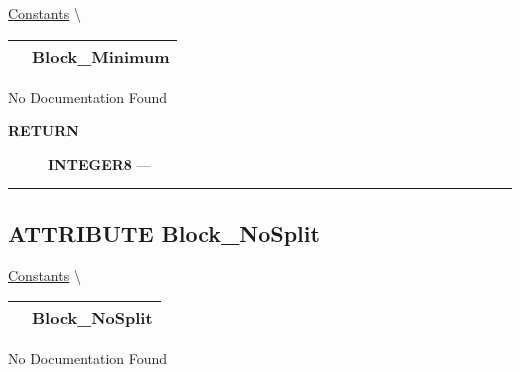 \hypertarget{ecldoc:pbblas.constants.block_minimum}{}
\hspace{0pt} \hyperlink{ecldoc:PBblas.Constants}{Constants} \textbackslash 

{\renewcommand{\arraystretch}{1.5}
\begin{tabularx}{\textwidth}{|>{\raggedright\arraybackslash}l|X|}
\hline
\hspace{0pt}\mytexttt{\color{red} } & \textbf{Block\_Minimum} \\
\hline
\end{tabularx}
}

\par





No Documentation Found








\par
\begin{description}
\item [\colorbox{tagtype}{\color{white} \textbf{\textsf{RETURN}}}] \textbf{INTEGER8} --- 
\end{description}




\rule{\linewidth}{0.5pt}
\subsection*{\textsf{\colorbox{headtoc}{\color{white} ATTRIBUTE}
Block\_NoSplit}}

\hypertarget{ecldoc:pbblas.constants.block_nosplit}{}
\hspace{0pt} \hyperlink{ecldoc:PBblas.Constants}{Constants} \textbackslash 

{\renewcommand{\arraystretch}{1.5}
\begin{tabularx}{\textwidth}{|>{\raggedright\arraybackslash}l|X|}
\hline
\hspace{0pt}\mytexttt{\color{red} } & \textbf{Block\_NoSplit} \\
\hline
\end{tabularx}
}

\par





No Documentation Found








